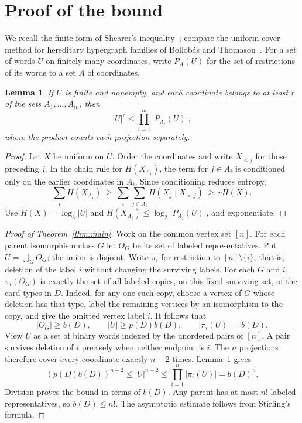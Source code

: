 \documentclass[11pt]{article}
\newtheorem{lemma}[theorem]{Lemma}
\theoremstyle{definition}\newtheorem{definition}[theorem]{Definition}\theoremstyle{plain}
\begin{document}
\section{Proof of the bound}
We recall the finite form of Shearer's inequality~\cite{shearer}; compare the uniform-cover method for hereditary hypergraph families of Bollob\'as and Thomason~\cite{bt}. For a set of words $U$ on finitely many coordinates, write $P_A(U)$ for the set of restrictions of its words to a set $A$ of coordinates.
\begin{lemma}\label{lem:proj}
If $U$ is finite and nonempty, and each coordinate belongs to at least $r$ of the sets $A_1,\ldots,A_m$, then
\[
 |U|^r\le\prod_{i=1}^{m}|P_{A_i}(U)| ,
\]
where the product counts each projection separately.
\end{lemma}
\begin{proof}
Let $X$ be uniform on $U$. Order the coordinates and write $X_{<j}$ for those preceding $j$. In the chain rule for $H(X_{A_i})$, the term for $j\in A_i$ is conditioned only on the earlier coordinates in $A_i$. Since conditioning reduces entropy,
\[
\sum_i H(X_{A_i})\ \ge\ \sum_i\sum_{j\in A_i}H(X_j\mid X_{<j})
\ \ge\ r H(X).
\]
Use $H(X)=\log_2|U|$ and $H(X_{A_i})\le\log_2|P_{A_i}(U)|$, and exponentiate.
\end{proof}

\begin{proof}[Proof of Theorem~\ref{thm:main}]
Work on the common vertex set $[n]$. For each parent isomorphism class $G$ let $O_G$ be its set of labeled representatives. Put $U=\bigcup_G O_G$; the union is disjoint. Write $\pi_i$ for restriction to $[n]\setminus\{i\}$, that is, deletion of the label $i$ without changing the surviving labels. For each $G$ and $i$, $\pi_i(O_G)$ is exactly the set of all labeled copies, on this fixed surviving set, of the card types in $D$. Indeed, for any one such copy, choose a vertex of $G$ whose deletion has that type, label the remaining vertices by an isomorphism to the copy, and give the omitted vertex label $i$. It follows that
\[
   |O_G|\ge b(D),\qquad |U|\ge p(D)b(D),\qquad |\pi_i(U)|=b(D).
\]
View $U$ as a set of binary words indexed by the unordered pairs of $[n]$. A pair survives deletion of $i$ precisely when neither endpoint is $i$. The $n$ projections therefore cover every coordinate exactly $n-2$ times. Lemma~\ref{lem:proj} gives
\[
 (p(D)b(D))^{n-2}\le |U|^{n-2}
 \le \prod_{i=1}^n |\pi_i(U)| = b(D)^n .
\]
Division proves the bound in terms of $b(D)$. Any parent has at most $n!$ labeled representatives, so $b(D)\le n!$. The asymptotic estimate follows from Stirling's formula.
\end{proof}
\end{document}
